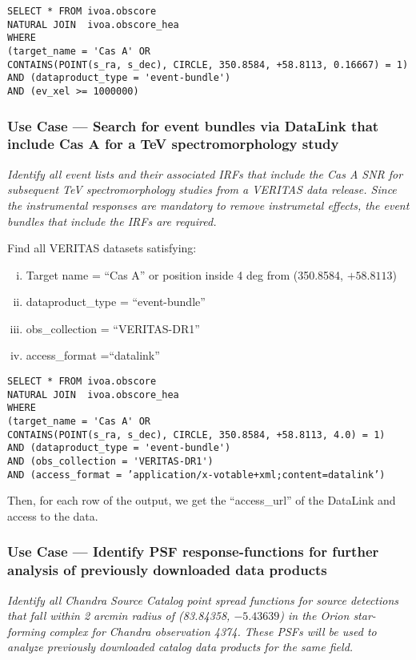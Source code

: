 \begin{verbatim}
SELECT * FROM ivoa.obscore
NATURAL JOIN  ivoa.obscore_hea
WHERE
(target_name = 'Cas A' OR
CONTAINS(POINT(s_ra, s_dec), CIRCLE, 350.8584, +58.8113, 0.16667) = 1)
AND (dataproduct_type = 'event-bundle')
AND (ev_xel >= 1000000)
\end{verbatim}

\subsubsection{Use Case --- Search for event bundles via DataLink that include Cas A for a TeV spectromorphology study}

{\em Identify all event lists and their associated \glspl{IRF} that include the Cas A SNR for subsequent TeV spectromorphology studies from a VERITAS data release. Since the instrumental responses are mandatory to remove instrumetal effects, the event bundles that include the  \glspl{IRF} are required.\/}

\medskip
\noindent Find all VERITAS datasets satisfying:
\begin{enumerate}[(i)]
  \item Target name = ``Cas A'' or position inside 4 deg from (350.8584, $+58.8113$)
  \item dataproduct\_type = ``event-bundle''
  \item obs\_collection = ``VERITAS-DR1''
  \item access\_format =``datalink''
\end{enumerate}

\begin{verbatim}
SELECT * FROM ivoa.obscore
NATURAL JOIN  ivoa.obscore_hea
WHERE
(target_name = 'Cas A' OR
CONTAINS(POINT(s_ra, s_dec), CIRCLE, 350.8584, +58.8113, 4.0) = 1)
AND (dataproduct_type = 'event-bundle')
AND (obs_collection = 'VERITAS-DR1')
AND (access_format = ’application/x-votable+xml;content=datalink’)
\end{verbatim}

Then, for each row of the output, we get the ``access\_url'' of the DataLink and access to the data.

\subsubsection{Use Case --- Identify PSF response-functions for further analysis of previously downloaded data products}

{\em Identify all Chandra Source Catalog point spread functions for source detections that fall within 2 arcmin radius of  (83.84358, $-5.43639$) in the Orion star-forming complex for Chandra observation 4374.  These PSFs will be used to analyze previously downloaded catalog data products for the same field.\/ }

